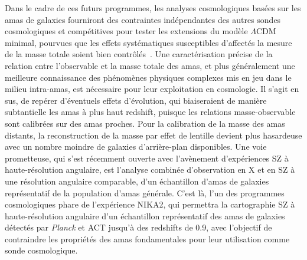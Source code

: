 Dans le cadre de ces futurs programmes, les analyses cosmologiques
basées sur les amas de galaxies fourniront des contraintes
indépendantes des autres sondes cosmologiques et compétitives pour
tester les extensions du modèle $\Lambda$CDM minimal, pourvues que les
effets systématiques susceptibles d'affectés la mesure de la masse
totale soient bien contrôlés~\citep{Mana2013, Krause2017, Sartoris2016, SO2019,
eROSITA_cosmo}.
Une caractérisation précise de la relation entre l’observable et la
masse totale des amas, et plus généralement une meilleure
connaissance des phénomènes physiques complexes mis en jeu dans le
milieu intra-amas, est nécessaire pour leur exploitation en cosmologie. 
Il s’agit en sus, de repérer d’éventuels effets d’évolution, qui
biaiseraient de manière subtantielle les amas à plus haut redshift,
puisque les relations masse-observable sont calibrées sur des amas
proches. Pour la calibration de la masse des amas distants, la
reconstruction de la masse par effet de lentille devient plus
hasardeuse avec un nombre moindre de galaxies d'arrière-plan
disponibles. Une voie prometteuse, qui s'est récemment ouverte avec
l'avènement d'expériences SZ à haute-résolution angulaire, est
l'analyse combinée d'observation en X et en SZ à une résolution
angulaire comparable, d'un échantillon d'amas de galaxies
représentatif de la population d'amas générale.
C’est là, l’un des programmes cosmologiques phare de l’expérience
NIKA2, qui permettra la cartographie SZ à haute-résolution angulaire
d’un échantillon représentatif des amas de galaxies détectés
par \emph{Planck} et ACT jusqu'à des redshifts de 0.9, avec l’objectif
de contraindre les propriétés des amas fondamentales pour leur
utilisation comme sonde cosmologique.\\


